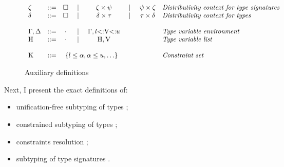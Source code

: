 
\begin{figure}
\footnotesize
\[
\begin{array}{lccccccl}
    \dctxtysig &::=& \square &
        \Alt& \typair{\dctxtysig}{\tysig} &
        \Alt& \typair{\tysig}{\dctxtysig} &
        \textit{Distributivity context for type signatures}
    \\
    \dctxty &::=& \square &
        \Alt& \typair{\dctxty}{\ty} &
        \Alt& \typair{\ty}{\dctxty} &
        \textit{Distributivity context for types}
    \\
    \\
    \AEnv, \UEnv &::=& \EmptyEnv &
        \Alt& \AEnv, \varbound{\vany}{\tylb}{\tyub} &
        & & 
        \textit{Type variable environment}
    \\
    \UEnvD &::=& \EmptyEnv &
        \Alt& \UEnvD, \vany &
        & & 
        \textit{Type variable list}
    \\
    \\
    \CSet &::=& \multicolumn{3}{c}{
            \ctrset{\ctrsub{\tylb}{\va}, \ctrsub{\va}{\tyub}, \ldots}
        } & & &
        \textit{Constraint set}
\end{array}
\]
\caption{Auxiliary definitions}\label{fig:subty-aux}
\end{figure}


Next, I present the exact definitions of:
\begin{itemize}
    \item unification-free subtyping of types ;
    \item constrained subtyping of types ;
    \item constraints resolution \solvectrdflt;
    \item subtyping of type signatures .
\end{itemize}

